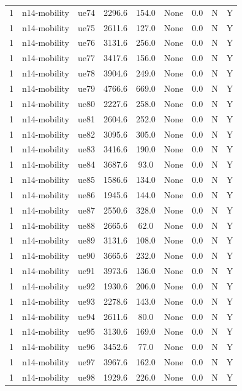 \begin{table}[ht]
\begin{tabular}{|c|c|c|c|c|c|c|c|c|}
1 & n14-mobility & ue74 & 2296.6 & 154.0 & None & 0.0 & N & Y \\
1 & n14-mobility & ue75 & 2611.6 & 127.0 & None & 0.0 & N & Y \\
1 & n14-mobility & ue76 & 3131.6 & 256.0 & None & 0.0 & N & Y \\
1 & n14-mobility & ue77 & 3417.6 & 156.0 & None & 0.0 & N & Y \\
1 & n14-mobility & ue78 & 3904.6 & 249.0 & None & 0.0 & N & Y \\
1 & n14-mobility & ue79 & 4766.6 & 669.0 & None & 0.0 & N & Y \\
1 & n14-mobility & ue80 & 2227.6 & 258.0 & None & 0.0 & N & Y \\
1 & n14-mobility & ue81 & 2604.6 & 252.0 & None & 0.0 & N & Y \\
1 & n14-mobility & ue82 & 3095.6 & 305.0 & None & 0.0 & N & Y \\
1 & n14-mobility & ue83 & 3416.6 & 190.0 & None & 0.0 & N & Y \\
1 & n14-mobility & ue84 & 3687.6 & 93.0 & None & 0.0 & N & Y \\
1 & n14-mobility & ue85 & 1586.6 & 134.0 & None & 0.0 & N & Y \\
1 & n14-mobility & ue86 & 1945.6 & 144.0 & None & 0.0 & N & Y \\
1 & n14-mobility & ue87 & 2550.6 & 328.0 & None & 0.0 & N & Y \\
1 & n14-mobility & ue88 & 2665.6 & 62.0 & None & 0.0 & N & Y \\
1 & n14-mobility & ue89 & 3131.6 & 108.0 & None & 0.0 & N & Y \\
1 & n14-mobility & ue90 & 3665.6 & 232.0 & None & 0.0 & N & Y \\
1 & n14-mobility & ue91 & 3973.6 & 136.0 & None & 0.0 & N & Y \\
1 & n14-mobility & ue92 & 1930.6 & 206.0 & None & 0.0 & N & Y \\
1 & n14-mobility & ue93 & 2278.6 & 143.0 & None & 0.0 & N & Y \\
1 & n14-mobility & ue94 & 2611.6 & 80.0 & None & 0.0 & N & Y \\
1 & n14-mobility & ue95 & 3130.6 & 169.0 & None & 0.0 & N & Y \\
1 & n14-mobility & ue96 & 3452.6 & 77.0 & None & 0.0 & N & Y \\
1 & n14-mobility & ue97 & 3967.6 & 162.0 & None & 0.0 & N & Y \\
1 & n14-mobility & ue98 & 1929.6 & 226.0 & None & 0.0 & N & Y \\

\end{tabular}
\end{table}
